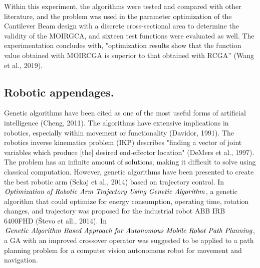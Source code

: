 \documentclass{JMLFS}
\begin{document}
Within this experiment, the algorithms were tested and compared with other literature, and the problem was used in the parameter optimization of the Cantilever Beam design with a discrete cross-sectional area to determine the validity of the MOIRGCA, and sixteen test functions were evaluated as well. The experimentation concludes with, "optimization results show that the function value obtained with MOIRCGA is superior to that obtained with RCGA'' (Wang et al., 2019).

\subsection {Robotic appendages.} Genetic algorithms have been cited as one of the most useful forms of artificial intelligence (Cheng, 2011). The algorithms have extensive implications in robotics, especially within movement or functionality (Davidor, 1991). The robotics inverse kinematics problem (IKP) describes "finding a vector of joint variables which produce [the] desired end-effector location" (DeMers et al., 1997). The problem has an infinite amount of solutions, making it difficult to solve using classical computation. However, genetic algorithms have been presented to create the best robotic arm (Sekaj et al., 2014) based on trajectory control. In $\emph {Optimization of Robotic Arm Trajectory Using Genetic Algorithm}$, a genetic algorithm that could optimize for energy consumption, operating time, rotation changes, and trajectory was proposed for the industrial robot ABB IRB 6400FHD (Števo et all., 2014). In $\emph {Genetic Algorithm Based Approach for Autonomous Mobile Robot Path Planning}$, a GA with an improved crossover operator was suggested to be applied to a path planning problem for a computer vision autonomous robot for movement and navigation.
\end{document}
